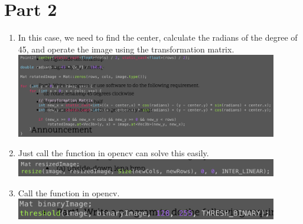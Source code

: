 \documentclass[12pt,a4paper]{article}
\begin{document}
\section*{Part 2}
\begin{enumerate}[label=(\alph*), resume]
	\item In this case, we need to find the center, calculate the radians of the degree of 45, and operate the image using the transformation matrix.\\
	\includegraphics[width=0.9\textwidth]{image/p4.png}
	\item Just call the function in opencv can solve this easily.\\
		\includegraphics[width=0.9\textwidth]{image/p5.png}
	\item Call the function in opencv.\\
		\includegraphics[width=0.9\textwidth]{image/p6.png}
\end{enumerate}
\end{document}
